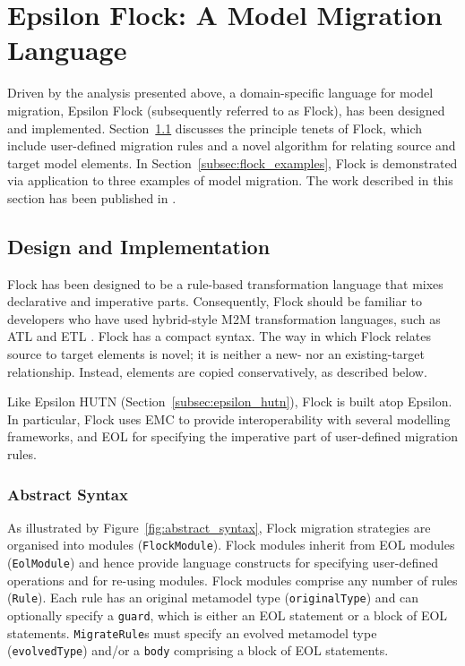 
\section{Epsilon Flock: A Model Migration Language}
\label{sec:flock}
Driven by the analysis presented above, a domain-specific language for model migration, Epsilon Flock (subsequently referred to as Flock), has been designed and implemented. Section~\ref{subsec:flock_design} discusses the principle tenets of Flock, which include user-defined migration rules and a novel algorithm for relating source and target model elements. In Section~\ref{subsec:flock_examples}, Flock is demonstrated via application to three examples of model migration. The work described in this section has been published in \cite{rose10flock}.

\subsection{Design and Implementation}
\label{subsec:flock_design}
Flock has been designed to be a rule-based transformation language that mixes declarative and  imperative parts. Consequently, Flock should be familiar to developers who have used hybrid-style M2M transformation languages, such as ATL and ETL \cite{kolovos08etl}. Flock has a compact syntax. The way in which Flock relates source to target elements is novel; it is neither a new- nor an existing-target relationship. Instead, elements are copied conservatively, as described below.

Like Epsilon HUTN (Section~\ref{subsec:epsilon_hutn}), Flock is built atop Epsilon. In particular, Flock uses EMC to provide interoperability with several modelling frameworks, and EOL for specifying the imperative part of user-defined migration rules.

\subsubsection{Abstract Syntax}
\label{subsubsec:abstract_syntax}
As illustrated by Figure~\ref{fig:abstract_syntax}, Flock migration strategies are organised into modules (\texttt{Fl\-ockMo\-du\-le}). Flock modules inherit from EOL modules (\texttt{Eo\-lMod\-ule}) and hence provide language constructs for specifying user-defined operations and for re-using modules. Flock modules comprise any number of rules (\texttt{Ru\-le}). Each rule has an original metamodel type (\texttt{or\-ig\-in\-alTy\-pe}) and can optionally specify a \texttt{gu\-ard}, which is either an EOL statement or a block of EOL statements. \texttt{Mi\-gr\-ateRu\-le}s must specify an evolved metamodel type (\texttt{ev\-ol\-vedTy\-pe}) and/or a \texttt{bo\-dy} comprising a block of EOL statements.

